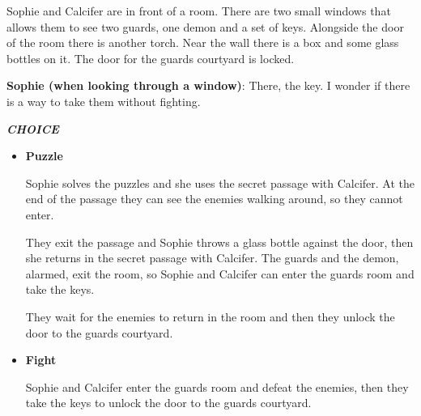 
Sophie and Calcifer are in front of a room. There are two small windows that allows them to see two guards, one demon and a set of keys. Alongside the door of the room there is another torch. Near the wall there is a box and some glass bottles on it. The door for the guards courtyard is locked.

\textbf{Sophie (when looking through a window)}: There, the key. I wonder if there is a way to take them without fighting.

\textit{\textbf{CHOICE}}
\begin{itemize}
  \item \textbf{Puzzle}
  
  Sophie solves the puzzles and she uses the secret passage with Calcifer. At the end of the passage they can see the enemies walking around, so they cannot enter.
  
  They exit the passage and Sophie throws a glass bottle against the door, then she returns in the secret passage with Calcifer. The guards and the demon, alarmed, exit the room, so Sophie and Calcifer can enter the guards room and take the keys.
  
  They wait for the enemies to return in the room and then they unlock the door to the guards courtyard.

  \item \textbf{Fight}
  
  Sophie and Calcifer enter the guards room and defeat the enemies, then they take the keys to unlock the door to the guards courtyard.
\end{itemize}


